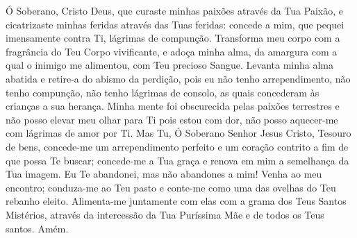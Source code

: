 \documentclass{subfiles}
\begin{document}
Ó Soberano, Cristo Deus, que curaste minhas paixões através da Tua
Paixão, e cicatrizaste minhas feridas através das Tuas feridas: concede a mim,
que pequei imensamente contra Ti, lágrimas de compunção. Transforma meu
corpo com a fragrância do Teu Corpo vivificante, e adoça minha alma, da
amargura com a qual o inimigo me alimentou, com Teu precioso Sangue.
Levanta minha alma abatida e retire-a do abismo da perdição, pois eu não
tenho arrependimento, não tenho compunção, não tenho lágrimas de consolo,
as quais concederam às crianças a sua herança. Minha mente foi obscurecida
pelas paixões terrestres e não posso elevar meu olhar para Ti pois estou com
dor, não posso aquecer-me com lágrimas de amor por Ti. Mas Tu, Ó Soberano
Senhor Jesus Cristo, Tesouro de bens, concede-me um arrependimento
perfeito e um coração contrito a fim de que possa Te buscar; concede-me a
Tua graça e renova em mim a semelhança da Tua imagem. Eu Te abandonei,
mas não abandones a mim! Venha ao meu encontro; conduza-me ao Teu pasto
e conte-me como uma das ovelhas do Teu rebanho eleito. Alimenta-me
juntamente com elas com a grama dos Teus Santos Mistérios, através da
intercessão da Tua Puríssima Mãe e de todos os Teus santos. Amém.
\end{document}
